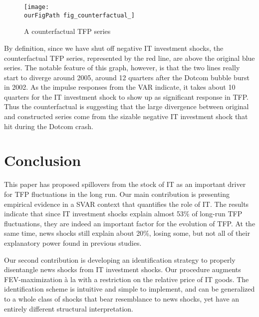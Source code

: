 \documentclass[11pt]{article}
\def \ourFigPath {../../Figures/}
\renewcommand{\[}{\begin{equation}}
\renewcommand{\]}{\end{equation}}
\begin{document}
\begin{figure}[h!]
\caption{A counterfactual TFP series}
\label{fig_counter}

\vspace{0.5cm}
	\centering
	\texttt{[image: \\ourFigPath fig\_counterfactual\_]}
\end{figure}

By definition, since we have shut off negative IT investment shocks, the counterfactual TFP series, represented by the red line, are above the original blue series. The notable feature of this graph, however, is that the two lines really start to diverge around 2005, around 12 quarters after the Dotcom bubble burst in 2002. As the impulse responses from the VAR indicate, it takes about 10 quarters for the IT investment shock to show up as significant response in TFP. Thus the counterfactual is suggesting that the large divergence between original and constructed series come from the sizable negative IT investment shock that hit during the Dotcom crash. 

\section{Conclusion}
\label{sec_conclusion}
This paper has proposed spillovers from the stock of IT as an important driver for TFP fluctuations in the long run. Our main contribution is presenting empirical evidence in a SVAR context that quantifies the role of IT. The results indicate that since IT investment shocks explain almost 53\% of long-run TFP fluctuations, they are indeed an important factor for the evolution of TFP. At the same time, news shocks still explain about 20\%, losing some, but not all of their explanatory power found in previous studies.

Our second contribution is developing an identification strategy to properly disentangle news shocks from IT investment shocks. Our procedure augments FEV-maximization \`a la \cite{barsky_sims2011} with a restriction on the relative price of IT goods. The identification scheme is intuitive and simple to implement, and can be generalized to a whole class of shocks that bear resemblance to news shocks, yet have an entirely different structural interpretation. 



\newpage
\nocite{*}
 
 
 
\end{document}
